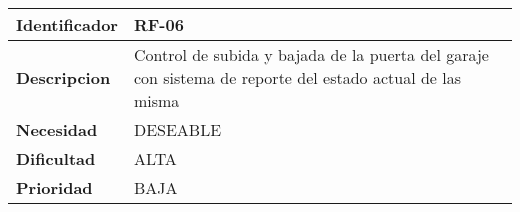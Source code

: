 \begin{center}
    \begin{tabular}{|p{2.6cm}|p{12cm}|}
    \hline
    \textbf{Identificador} & RF-06\\
    \hline
    \textbf{Descripcion} & Control de subida y bajada de la puerta del garaje con sistema de reporte del estado actual de las misma\\
    \hline
    \textbf{Necesidad} & DESEABLE\\
    \hline
    \textbf{Dificultad} & ALTA\\
    \hline
    \textbf{Prioridad} & BAJA\\
    \hline
    \end{tabular}
\end{center}
